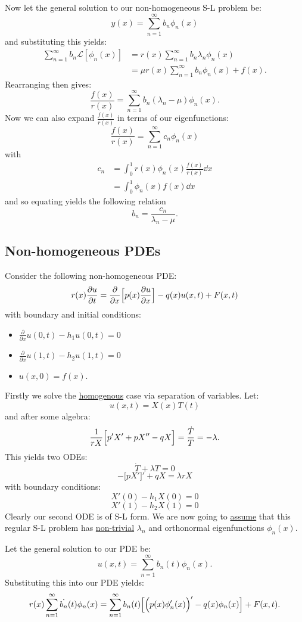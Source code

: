 \documentclass{article}
\begin{document}
\begin{multicols}{3}
Now let the general solution to our non-homogeneous S-L problem be:
$$y(x)=\sum_{n=1}^{\infty} b_n\phi_n(x)$$
and substituting this yields:
\begin{align*}
    \sum_{n=1}^{\infty}b_n\mathcal{L}[\phi_n(x)]
    &=r(x)\sum_{n=1}^{\infty}b_n\lambda_n\phi_n(x) \\
    &=\mu r(x)\sum_{n=1}^{\infty}b_n\phi_n(x)+f(x).
\end{align*}
Rearranging then gives:
$$\frac{f(x)}{r(x)}=\sum_{n=1}^{\infty}
b_n(\lambda_n-\mu)\phi_n(x).$$
Now we can also expand $\displaystyle\frac{f(x)}{r(x)}$
in terms of our eigenfunctions:
$$\frac{f(x)}{r(x)}=\sum_{n=1}^{\infty}c_n\phi_n(x)$$
with
\begin{align*}
    c_n
    &=\int_{0}^{1}r(x)\phi_n(x)
    \frac{f(x)}{r(x)} \dd x \\
    &=\int_{0}^{1}\phi_n(x)f(x)\dd x
\end{align*}
and so equating yields the following relation
$$b_n=\frac{c_n}{\lambda_n-\mu}.$$

\subsection{Non-homogeneous PDEs}
Consider the following non-homogeneous PDE:
$$r(x)\frac{\partial u}{\partial t}
=\frac{\partial}{\partial x}\Bigl[
p(x)\frac{\partial u}{\partial x}
\Bigr]-q(x)u(x,t)+F(x,t)$$
with boundary and initial conditions:
\begin{itemize}
    \item $\displaystyle\frac{\partial}{\partial x}
    u(0,t)-h_1 u(0,t)=0$
    \item $\displaystyle\frac{\partial}{\partial x}
    u(1,t)-h_2 u(1,t)=0$
    \item $u(x,0)=f(x)$.
\end{itemize}
Firstly we solve the \underline{homogenous} 
case via separation of variables. Let:
$$u(x,t)=X(x)T(t)$$
and after some algebra:
$$\frac{1}{rX}\Bigl[p'X'+pX''
-qX\Bigr]=\frac{\dot{T}}{T}=-\lambda.$$
This yields two ODEs:
$$\dot{T}+\lambda T=0$$
$$-\bigl[pX'\bigr]'+qX=\lambda rX$$
with boundary conditions:
$$X'(0)-h_1 X(0)=0$$
$$X'(1)-h_2 X(1)=0$$
Clearly our second ODE is of S-L form.
We are now going to \underline{assume} that this
regular S-L problem has \underline{non-trivial} $\lambda_n$
and orthonormal eigenfunctions $\phi_n(x)$.

Let the general solution to our PDE be:
$$u(x,t)=\sum_{n=1}^{\infty}b_n(t)\phi_n(x).$$
Substituting this into our PDE yields:
$$r(x)\sum_{n=1}^{\infty}\dot{b_n}(t)\phi_n(x)
=\sum_{n=1}^{\infty}b_n(t)\Bigl[\Bigl(p(x)
\phi'_n(x)\Bigr)'-q(x)\phi_n(x)\Bigr]+F(x,t).$$


\end{multicols}
\end{document}
